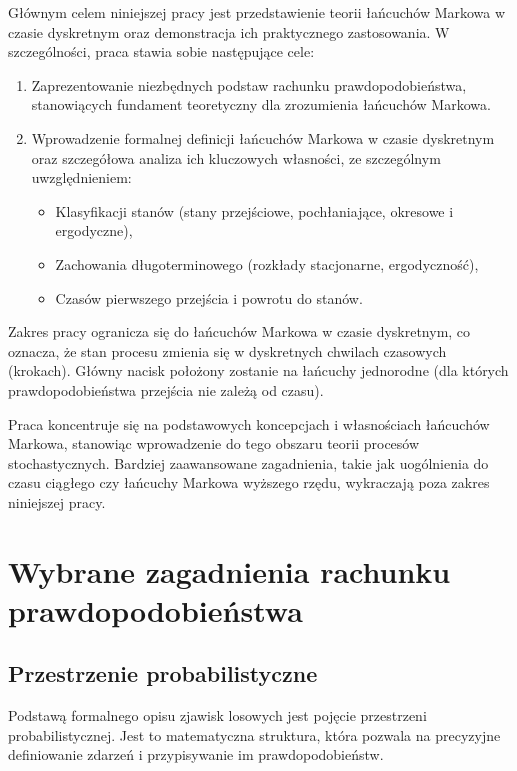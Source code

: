 \documentclass[final,a4paper,openany,12pt]{mwbk}
\begin{document}
Głównym celem niniejszej pracy jest przedstawienie teorii łańcuchów Markowa w czasie dyskretnym oraz demonstracja ich praktycznego zastosowania. W szczególności, praca stawia sobie następujące cele:

\begin{enumerate}
    \item Zaprezentowanie niezbędnych podstaw rachunku prawdopodobieństwa, stanowiących fundament teoretyczny dla zrozumienia łańcuchów Markowa.
    
    \item Wprowadzenie formalnej definicji łańcuchów Markowa w czasie dyskretnym oraz szczegółowa analiza ich kluczowych własności, ze szczególnym uwzględnieniem:
    \begin{itemize}
        \item Klasyfikacji stanów (stany przejściowe, pochłaniające, okresowe i ergodyczne),
        \item Zachowania długoterminowego (rozkłady stacjonarne, ergodyczność),
        \item Czasów pierwszego przejścia i powrotu do stanów.
    \end{itemize}
    
\end{enumerate}

Zakres pracy ogranicza się do łańcuchów Markowa w czasie dyskretnym, co oznacza, że stan procesu zmienia się w dyskretnych chwilach czasowych (krokach). Główny nacisk położony zostanie na łańcuchy jednorodne (dla których prawdopodobieństwa przejścia nie zależą od czasu).

Praca koncentruje się na podstawowych koncepcjach i własnościach łańcuchów Markowa, stanowiąc wprowadzenie do tego obszaru teorii procesów stochastycznych. Bardziej zaawansowane zagadnienia, takie jak uogólnienia do czasu ciągłego czy łańcuchy Markowa wyższego rzędu, wykraczają poza zakres niniejszej pracy.

\chapter{Wybrane zagadnienia rachunku prawdopodobieństwa}

\section{Przestrzenie probabilistyczne}

Podstawą formalnego opisu zjawisk losowych jest pojęcie przestrzeni probabilistycznej. Jest to matematyczna struktura, która pozwala na precyzyjne definiowanie zdarzeń i przypisywanie im prawdopodobieństw.
\end{document}
